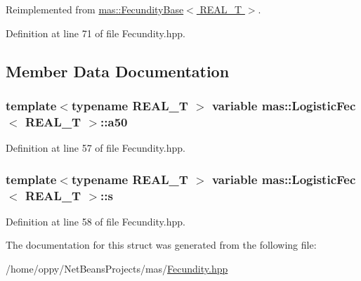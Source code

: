 Reimplemented from \hyperlink{structmas_1_1_fecundity_base_a5a0ca3b02791910dd012a30f1c2bf2a8}{mas\-::\-Fecundity\-Base$<$ R\-E\-A\-L\-\_\-\-T $>$}.



Definition at line 71 of file Fecundity.\-hpp.



\subsection{Member Data Documentation}
\hypertarget{structmas_1_1_logistic_fec_a6e72c6de9d6e0a69fea2c9fe580bedb3}{
\subsubsection[{a50}]{\setlength{\rightskip}{0pt plus 5cm}template$<$typename R\-E\-A\-L\-\_\-\-T $>$ {\bf variable} {\bf mas\-::\-Logistic\-Fec}$<$ R\-E\-A\-L\-\_\-\-T $>$\-::a50}}\label{structmas_1_1_logistic_fec_a6e72c6de9d6e0a69fea2c9fe580bedb3}


Definition at line 57 of file Fecundity.\-hpp.

\hypertarget{structmas_1_1_logistic_fec_a69f62cb6f7c2e37af6c8cebc041e864e}{
\subsubsection[{s}]{\setlength{\rightskip}{0pt plus 5cm}template$<$typename R\-E\-A\-L\-\_\-\-T $>$ {\bf variable} {\bf mas\-::\-Logistic\-Fec}$<$ R\-E\-A\-L\-\_\-\-T $>$\-::s}}\label{structmas_1_1_logistic_fec_a69f62cb6f7c2e37af6c8cebc041e864e}


Definition at line 58 of file Fecundity.\-hpp.



The documentation for this struct was generated from the following file\-:\begin{DoxyCompactItemize}
\item 
/home/oppy/\-Net\-Beans\-Projects/mas/\hyperlink{_fecundity_8hpp}{Fecundity.\-hpp}\end{DoxyCompactItemize}
